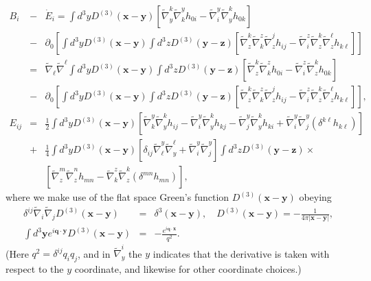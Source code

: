 \begin{eqnarray}
B_i &-&\dot{E}_i= \int d^3y D^{(3)}(\mathbf x - \mathbf y)\left[ \tilde\nabla^k_y \tilde\nabla_k^y h_{0i}
- \tilde\nabla_i^y \tilde\nabla^k_y h_{0k} \right]
\nonumber\\
&-&\partial_0\left[\int d^3y D^{(3)}(\mathbf x - \mathbf y) \int d^3z D^{(3)}(\mathbf y - \mathbf z)
\left[ \tilde\nabla^k_z \tilde\nabla_k^z \tilde\nabla^j_z h_{ij}-\tilde\nabla_i^z \tilde\nabla^k_z \tilde\nabla^{\ell}_z h_{k\ell}\right]\right]
\nonumber\\
&=&\tilde{\nabla}_{\ell}\tilde{\nabla}^{\ell} \int d^3y D^{(3)}(\mathbf x - \mathbf y) \int d^3z D^{(3)}(\mathbf y - \mathbf z)\left[ \tilde\nabla^k_z \tilde\nabla_k^z h_{0i}
- \tilde\nabla_i^z \tilde\nabla^k_z h_{0k} \right]
\nonumber\\
&-&\partial_0\left[\int d^3y D^{(3)}(\mathbf x - \mathbf y) \int d^3z D^{(3)}(\mathbf y - \mathbf z)
\left[ \tilde\nabla^k_z \tilde\nabla_k^z \tilde\nabla^j_z h_{ij}-\tilde\nabla_i^z \tilde\nabla^k_z \tilde\nabla^{\ell}_z h_{k\ell}\right]\right],
\nonumber\\
E_{ij}&=&\frac{1}{2}\int d^3yD^{(3)}(\mathbf{x}-\mathbf{y})\left[\tilde{\nabla}^y_k\tilde{\nabla}_y^kh_{ij}-\tilde{\nabla}^y_i\tilde{\nabla}_y^kh_{kj}-\tilde{\nabla}^y_j\tilde{\nabla}_y^kh_{ki}+\tilde{\nabla}^y_i\tilde{\nabla}^y_j(\delta^{k\ell}h_{k\ell})\right]
\nonumber\\
&+&\frac{1}{4}\int d^3yD^{(3)}(\mathbf{x}-\mathbf{y})\left[\delta_{ij}\tilde{\nabla}^y_{\ell}\tilde{\nabla}_y^{\ell}+\tilde{\nabla}^y_i\tilde{\nabla}^y_j\right]\int d^3zD^{(3)}(\mathbf{y}-\mathbf{z})\times
\nonumber\\
&&\left[\tilde{\nabla}_z^m \tilde{\nabla}_z^{n}h_{mn}-\tilde{\nabla}^z_k\tilde{\nabla}_z^k(\delta^{mn}h_{mn})\right],
\label{2.8}
\end{eqnarray}
%
where we make use of the flat space Green's function $D^{(3)}(\mathbf{x}-\mathbf{y})$ obeying 
%
\begin{eqnarray}
\delta^{ij}\tilde{\nabla}_i\tilde{\nabla}_jD^{(3)}(\mathbf{x}-\mathbf{y})&=&\delta^3(\mathbf{x}-\mathbf{y}),\quad
D^{(3)}(\mathbf{x}-\mathbf{y})=-\frac{1}{4\pi |\mathbf{x}-\mathbf{y}|},
\nonumber\\
\int d^3\mathbf{y}e^{i\mathbf{q}\cdot\mathbf{y}}D^{(3)}(\mathbf{x}-\mathbf{y})&=&-\frac{e^{i\mathbf{q}\cdot\mathbf{x}}}{q^2}.
\label{2.9}
\end{eqnarray}
%
(Here $q^2=\delta^{ij}q_{i}q_{j}$, and in $\tilde{\nabla}_y^i$ the $y$ indicates that the derivative is taken with respect to the $y$ coordinate, and likewise for other coordinate choices.)


